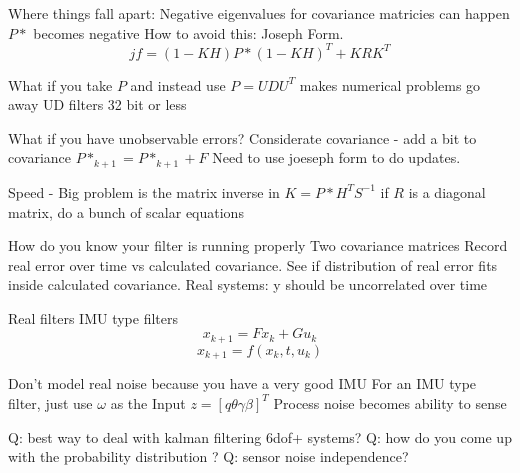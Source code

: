 \documentclass[10pt]{article}
\begin{document}
Where things fall apart:
Negative eigenvalues for covariance matricies can happen $P*$ becomes negative 
How to avoid this: Joseph Form.
$$jf = (1-KH)P*(1-KH)^T+KRK^T$$

What if you take $P$ and instead use $P = UDU^T$ makes numerical problems go away UD filters 32 bit or less

What if you have unobservable errors? Considerate covariance - add a bit to covariance $P*_{k+1} = P*_{k+1} + F$ Need to use joeseph form to do updates.

Speed - 
Big problem is the matrix inverse in $K = P*H^TS^{-1}$
if $R$ is a diagonal matrix, do a bunch of scalar equations 

How do you know your filter is running properly 
Two covariance matrices 
Record real error over time vs calculated covariance. See if distribution of real error fits inside calculated covariance. 
Real systems: y should be uncorrelated over time 

Real filters
IMU type filters 
$$x_{k+1} = Fx_{k} + Gu_k$$
$$x_{k+1} = f(x_k,t,u_k)$$

Don't model real noise because you have a very good IMU 
For an IMU type filter, just use $\omega$ as the Input
$z = [q \theta \gamma \beta]^T$
Process noise becomes ability to sense

Q: best way to deal with kalman filtering 6dof+ systems?
Q: how do you come up with the probability distribution ?  
Q: sensor noise independence?
 
\end{document}

